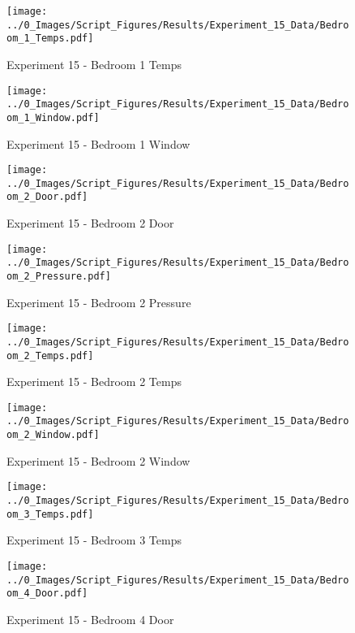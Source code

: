 	\begin{figure}[H]
		\centering
		\texttt{[image: ../0\_Images/Script\_Figures/Results/Experiment\_15\_Data/Bedroom\_1\_Temps.pdf]}
		\caption[]{Experiment 15 - Bedroom 1 Temps}
	\end{figure}
 
	\clearpage

	\begin{figure}[H]
		\centering
		\texttt{[image: ../0\_Images/Script\_Figures/Results/Experiment\_15\_Data/Bedroom\_1\_Window.pdf]}
		\caption[]{Experiment 15 - Bedroom 1 Window}
	\end{figure}
 

	\begin{figure}[H]
		\centering
		\texttt{[image: ../0\_Images/Script\_Figures/Results/Experiment\_15\_Data/Bedroom\_2\_Door.pdf]}
		\caption[]{Experiment 15 - Bedroom 2 Door}
	\end{figure}
 
	\clearpage

	\begin{figure}[H]
		\centering
		\texttt{[image: ../0\_Images/Script\_Figures/Results/Experiment\_15\_Data/Bedroom\_2\_Pressure.pdf]}
		\caption[]{Experiment 15 - Bedroom 2 Pressure}
	\end{figure}
 

	\begin{figure}[H]
		\centering
		\texttt{[image: ../0\_Images/Script\_Figures/Results/Experiment\_15\_Data/Bedroom\_2\_Temps.pdf]}
		\caption[]{Experiment 15 - Bedroom 2 Temps}
	\end{figure}
 
	\clearpage

	\begin{figure}[H]
		\centering
		\texttt{[image: ../0\_Images/Script\_Figures/Results/Experiment\_15\_Data/Bedroom\_2\_Window.pdf]}
		\caption[]{Experiment 15 - Bedroom 2 Window}
	\end{figure}
 

	\begin{figure}[H]
		\centering
		\texttt{[image: ../0\_Images/Script\_Figures/Results/Experiment\_15\_Data/Bedroom\_3\_Temps.pdf]}
		\caption[]{Experiment 15 - Bedroom 3 Temps}
	\end{figure}
 
	\clearpage

	\begin{figure}[H]
		\centering
		\texttt{[image: ../0\_Images/Script\_Figures/Results/Experiment\_15\_Data/Bedroom\_4\_Door.pdf]}
		\caption[]{Experiment 15 - Bedroom 4 Door}
	\end{figure}
 

